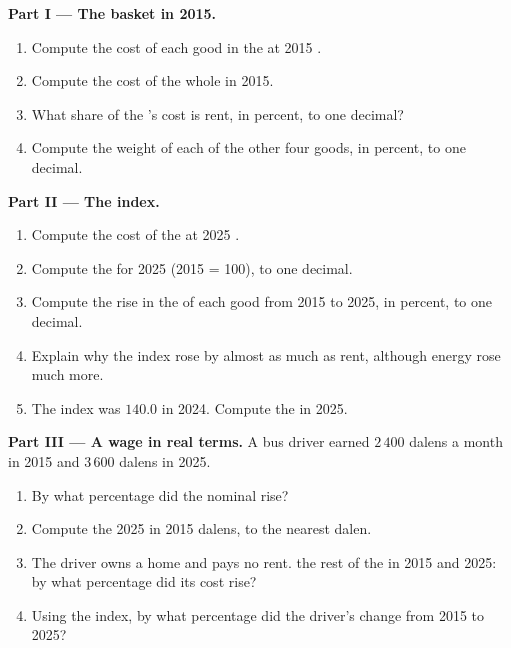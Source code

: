 \begin{problem}
\medskip
\noindent\textbf{Part I --- The basket in 2015.}
\begin{enumerate}
  \item Compute the cost of each good in the  at 2015 .
  \item Compute the cost of the whole  in 2015.
  \item What share of the 's cost is rent, in percent, to one decimal?
  \item Compute the weight of each of the other four goods, in percent, to one decimal.
\end{enumerate}

\medskip
\noindent\textbf{Part II --- The index.}
\begin{enumerate}[resume]
  \item Compute the cost of the  at 2025 .
  \item Compute the  for 2025 (2015 = 100), to one decimal.
  \item Compute the rise in the  of each good from 2015 to 2025, in percent, to one decimal.
  \item Explain why the index rose by almost as much as rent, although energy rose much more.
  \item The index was $140.0$ in 2024. Compute the  in 2025.
\end{enumerate}

\medskip
\noindent\textbf{Part III --- A wage in real terms.} A bus driver earned $2\,400$ dalens a month in
2015 and $3\,600$ dalens in 2025.
\begin{enumerate}[resume]
  \item By what percentage did the nominal  rise?
  \item Compute the 2025  in 2015 dalens, to the nearest dalen.
  \item The driver owns a home and pays no rent.  the rest of the  in 2015 and 2025: by
        what percentage did its cost rise?
  \item Using the index, by what percentage did the driver's  change from 2015 to 2025?
\end{enumerate}
\end{problem}
